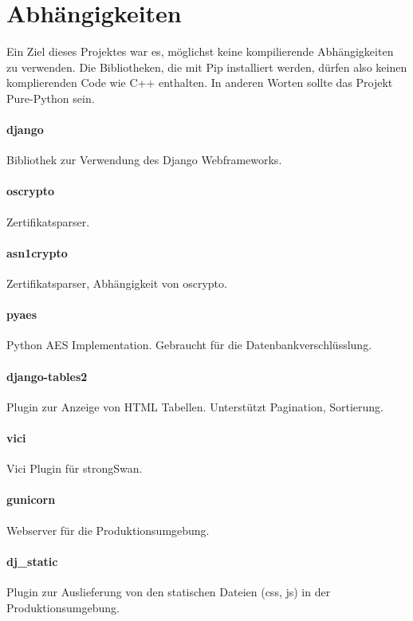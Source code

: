\section{Abhängigkeiten}
Ein Ziel dieses Projektes war es, möglichst keine kompilierende Abhängigkeiten zu verwenden. Die Bibliotheken, die mit Pip installiert werden, dürfen also keinen komplierenden Code wie C++ enthalten. In anderen Worten sollte das Projekt Pure-Python sein. 

\paragraph{django} Bibliothek zur Verwendung des Django Webframeworks.
\paragraph{oscrypto} Zertifikatsparser.
\paragraph{asn1crypto} Zertifikatsparser, Abhängigkeit von oscrypto. 
\paragraph{pyaes} Python AES Implementation. Gebraucht für die Datenbankverschlüsslung.
\paragraph{django-tables2} Plugin zur Anzeige von HTML Tabellen. Unterstützt Pagination, Sortierung.
\paragraph{vici} Vici Plugin für strongSwan.
\paragraph{gunicorn} Webserver für die Produktionsumgebung.
\paragraph{dj\_static} Plugin zur Auslieferung von den statischen Dateien (css, js) in der Produktionsumgebung.
